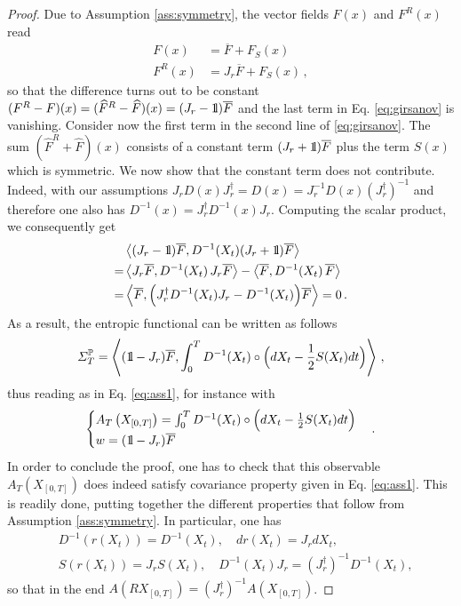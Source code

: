 \documentclass[a4paper,11pt]{article}
\numberwithin{equation}{section}
\newcommand{\bbbone}{\mathchoice {\rm 1\mskip-4mu l} {\rm 1\mskip-4mu l}
{\rm 1\mskip-4.5mu l} {\rm 1\mskip-5mu l}}
\begin{document}
\begin{proof}
    Due to Assumption \ref{ass:symmetry}, the vector fields $F(x)$ and $F^R(x)$ read
    \begin{align*}
        F(x) &= \overline{F} + F_S(x)  \\
        F^R(x) &= J_r \overline{F} + F_S(x) \,,
    \end{align*}
    so that the difference turns out to be constant $(F^R- F)(x)= (\widehat{F}^R- \widehat{F})(x)= (J_r - \bbbone)\overline{F}$
    and the last term in Eq. \eqref{eq:girsanov} is vanishing. Consider now the first term in the second line of \eqref{eq:girsanov}. The sum $(\widehat{F}^R+\widehat{F})(x)$ consists of a constant term $(J_r + \bbbone)\overline{F}$ plus the term $S(x)$ which is symmetric.
    We now show that the constant term does not contribute. Indeed, with our assumptions $J_r D (x) J_r^\dag =D(x) = J_r^{-1} D (x) (J_r^\dag)^{-1}$ and therefore one also has $D^{-1}(x)=  J_r^\dag D^{-1}(x) J_r$. Computing the scalar product, we consequently get
    \begin{align*}
       &\left\langle  (J_r - \bbbone)\overline{F} ,D^{-1}(X_{t}) (J_r + \bbbone)\overline{F} \right\rangle \\
       =& \left\langle  J_r \overline{F} ,D^{-1}(X_{t}) \, J_r  \overline{F} \right\rangle  - \left\langle  \overline{F} , D^{-1}(X_{t})  \,\overline{F} \right\rangle \\
       =& \left\langle  \overline{F} , \Big( J_r^\dag D^{-1}(X_{t}) J_r -  D^{-1}(X_{t}) \Big)\overline{F} \right\rangle = 0 \,.
    \end{align*}
    As a result, the entropic functional can be written as follows
    \begin{equation*}
       \varSigma_{T}^{\mathbb{P}}=  \left\langle (\bbbone -J_r) \overline{F}, \int_{0}^{T}  D^{-1}(X_{t})\circ \Big(dX_{t} - \frac{1}{2} S(X_t) dt \Big) \right\rangle \,,
       \label{eq:GenStefano}
    \end{equation*}
    thus reading as in Eq. \eqref{eq:ass1}, for instance with 
    $$\begin{cases}
     A_T\left(X_{\left[0,T\right]}\right)=\int_{0}^{T}  D^{-1}(X_{t})\circ \Big(dX_{t} - \frac{1}{2} S(X_t) dt \Big) \\
     w= (\bbbone -J_r) \overline{F} 
    \end{cases}.$$ 
    In order to conclude the proof, one has to check that this observable $A_T\left(X_{\left[0,T\right]}\right)$ does indeed satisfy covariance property given in Eq. \eqref{eq:ass1}. This is readily done, putting together the different properties that follow from Assumption \ref{ass:symmetry}. In particular, one has
    \begin{align*}
        &D^{-1}(r(X_t))= D^{-1}(X_t), \quad  d r(X_t)= J_r dX_t, \\
        &S(r(X_t))= J_r S(X_t),\quad  D^{-1}(X_t) J_r= (J_r^\dag)^{-1} D^{-1}(X_t) ,
    \end{align*}
    so that in the end $A\left(R X_{\left[0,T\right]}\right)= (J_r^\dag)^{-1} A\left(X_{\left[0,T\right]}\right)$.    
\end{proof}
\end{document}

